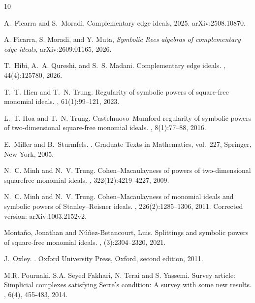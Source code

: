 \documentclass[12pt]{amsart}
\begin{document}
\begin{thebibliography}{10}

A.~Ficarra and S.~Moradi.
\newblock Complementary edge ideals, 2025.
\newblock arXiv:2508.10870.

A. Ficarra, S. Moradi, and Y. Muta,
\textit{Symbolic Rees algebras of complementary edge ideals},
arXiv:2609.01165, 2026.


T.~Hibi, A.~A. Qureshi, and S.~S. Madani.
\newblock Complementary edge ideals.
, 44(4):125780, 2026.

T.~T. Hien and T.~N. Trung.
\newblock Regularity of symbolic powers of square-free monomial ideals.
, 61(1):99--121, 2023.

L.~T. Hoa and T.~N. Trung.
\newblock Castelnuovo--{Mumford} regularity of symbolic powers of
  two-dimensional square-free monomial ideals.
, 8(1):77--88, 2016.

E.~Miller and B.~Sturmfels.
.
\newblock Graduate Texts in Mathematics, vol.~227, Springer, New York, 2005.

N.~C. Minh and N.~V. Trung.
\newblock Cohen--{Macaulayness} of powers of two-dimensional squarefree
  monomial ideals.
, 322(12):4219--4227, 2009.

N.~C. Minh and N.~V. Trung.
\newblock Cohen--{Macaulayness} of monomial ideals and symbolic powers of
{Stanley--Reisner} ideals.
, 226(2):1285--1306, 2011.
\newblock Corrected version: arXiv:1003.2152v2.

Monta{\~n}o, Jonathan and N{\'u}{\~n}ez-Betancourt, Luis.
\newblock Splittings and symbolic powers of square-free monomial ideals.
, (3):2304--2320, 2021.


J.~Oxley.
.
\newblock Oxford University Press, Oxford, second edition, 2011.

M.R. Pournaki, S.A. Seyed Fakhari, N. Terai and S. Yassemi.
\newblock Survey article: Simplicial complexes satisfying Serre's condition: A survey with some new results.
, 6(4), 455-483, 2014.


\end{thebibliography}
\end{document}
